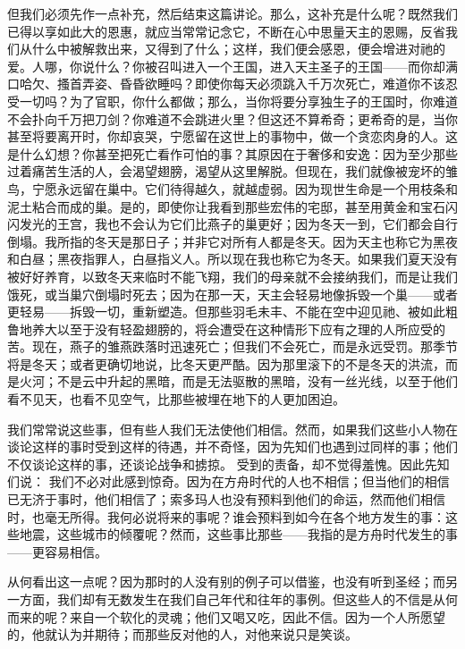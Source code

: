 但我们必须先作一点补充，然后结束这篇讲论。那么，这补充是什么呢？既然我们已得以享如此大的恩惠，就应当常常记念它，不断在心中思量天主的恩赐，反省我们从什么中被解救出来，又得到了什么；这样，我们便会感恩，便会增进对祂的爱。人哪，你说什么？你被召叫进入一个王国，进入天主圣子的王国——而你却满口哈欠、搔首弄姿、昏昏欲睡吗？即使你每天必须跳入千万次死亡，难道你不该忍受一切吗？为了官职，你什么都做；那么，当你将要分享独生子的王国时，你难道不会扑向千万把刀剑？你难道不会跳进火里？但这还不算希奇；更希奇的是，当你甚至将要离开时，你却哀哭，宁愿留在这世上的事物中，做一个贪恋肉身的人。这是什么幻想？你甚至把死亡看作可怕的事？其原因在于奢侈和安逸：因为至少那些过着痛苦生活的人，会渴望翅膀，渴望从这里解脱。但现在，我们就像被宠坏的雏鸟，宁愿永远留在巢中。它们待得越久，就越虚弱。因为现世生命是一个用枝条和泥土粘合而成的巢。是的，即使你让我看到那些宏伟的宅邸，甚至用黄金和宝石闪闪发光的王宫，我也不会认为它们比燕子的巢更好；因为冬天一到，它们都会自行倒塌。我所指的冬天是那日子；并非它对所有人都是冬天。因为天主也称它为黑夜和白昼；黑夜指罪人，白昼指义人。所以现在我也称它为冬天。如果我们夏天没有被好好养育，以致冬天来临时不能飞翔，我们的母亲就不会接纳我们，而是让我们饿死，或当巢穴倒塌时死去；因为在那一天，天主会轻易地像拆毁一个巢——或者更轻易——拆毁一切，重新塑造。但那些羽毛未丰、不能在空中迎见祂、被如此粗鲁地养大以至于没有轻盈翅膀的，将会遭受在这种情形下应有之理的人所应受的苦。现在，燕子的雏燕跌落时迅速死亡；但我们不会死亡，而是永远受罚。那季节将是冬天；或者更确切地说，比冬天更严酷。因为那里滚下的不是冬天的洪流，而是火河；不是云中升起的黑暗，而是无法驱散的黑暗，没有一丝光线，以至于他们看不见天，也看不见空气，比那些被埋在地下的人更加困迫。\par

我们常常说这些事，但有些人我们无法使他们相信。然而，如果我们这些小人物在谈论这样的事时受到这样的待遇，并不奇怪，因为先知们也遇到过同样的事；他们不仅谈论这样的事，还谈论战争和掳掠。 受到的责备，却不觉得羞愧。因此先知们说：  我们不必对此感到惊奇。因为在方舟时代的人也不相信；但当他们的相信已无济于事时，他们相信了；索多玛人也没有预料到他们的命运，然而他们相信时，也毫无所得。我何必说将来的事呢？谁会预料到如今在各个地方发生的事：这些地震，这些城市的倾覆呢？然而，这些事比那些——我指的是方舟时代发生的事——更容易相信。\par

从何看出这一点呢？因为那时的人没有别的例子可以借鉴，也没有听到圣经；而另一方面，我们却有无数发生在我们自己年代和往年的事例。但这些人的不信是从何而来的呢？来自一个软化的灵魂；他们又喝又吃，因此不信。因为一个人所愿望的，他就认为并期待；而那些反对他的人，对他来说只是笑谈。\par

